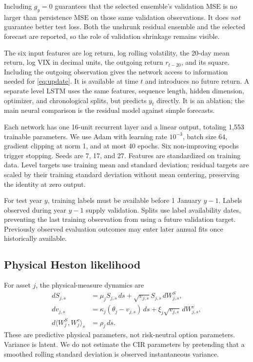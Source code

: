 Including $g_y=0$ guarantees that the selected ensemble's validation MSE is no larger than persistence MSE on those same validation observations. It does \emph{not} guarantee better test loss. Both the unshrunk residual ensemble and the selected forecast are reported, so the role of validation shrinkage remains visible.

The six input features are log return, log rolling volatility, the 20-day mean return, log VIX in decimal units, the outgoing return $r_{t-20}$, and its square. Including the outgoing observation gives the network access to information needed for \eqref{eq:update}. It is available at time $t$ and introduces no future return. A separate level LSTM uses the same features, sequence length, hidden dimension, optimizer, and chronological splits, but predicts $y_t$ directly. It is an ablation; the main neural comparison is the residual model against simple forecasts.

Each network has one 16-unit recurrent layer and a linear output, totaling 1,553 trainable parameters. We use Adam with learning rate $10^{-3}$, batch size 64, gradient clipping at norm 1, and at most 40 epochs. Six non-improving epochs trigger stopping. Seeds are 7, 17, and 27. Features are standardized on training data. Level targets use training mean and standard deviation; residual targets are scaled by their training standard deviation without mean centering, preserving the identity at zero output.

For test year $y$, training labels must be available before 1 January $y-1$. Labels observed during year $y-1$ supply validation. Splits use label availability dates, preventing the last training observation from using a future validation target. Previously observed evaluation outcomes may enter later annual fits once historically available.

\subsection{Physical Heston likelihood}
For asset $j$, the physical-measure dynamics are
\begin{align}
dS_{j,s}&=\mu_j S_{j,s}\,ds+\sqrt{v_{j,s}}S_{j,s}\,dW^S_{j,s},\\
dv_{j,s}&=\kappa_j(\theta_j-v_{j,s})\,ds+\xi_j\sqrt{v_{j,s}}\,dW^v_{j,s},\\
d\langle W^S_j,W^v_j\rangle_s&=\rho_j\,ds.
\end{align}
These are predictive physical parameters, not risk-neutral option parameters. Variance is latent. We do not estimate the CIR parameters by pretending that a smoothed rolling standard deviation is observed instantaneous variance.

